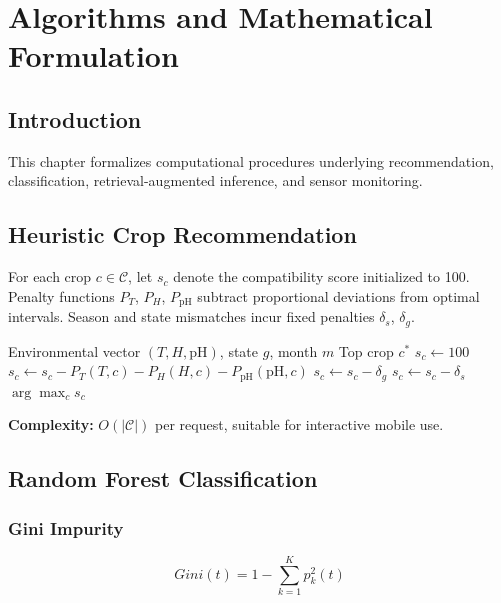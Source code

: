 \chapter{Algorithms and Mathematical Formulation}
\label{ch:algorithms}

\section{Introduction}
This chapter formalizes computational procedures underlying recommendation, classification, retrieval-augmented inference, and sensor monitoring.

\section{Heuristic Crop Recommendation}
\label{sec:algo_heuristic}

For each crop $c \in \mathcal{C}$, let $s_c$ denote the compatibility score initialized to 100. Penalty functions $P_T$, $P_H$, $P_{\mathrm{pH}}$ subtract proportional deviations from optimal intervals. Season and state mismatches incur fixed penalties $\delta_s$, $\delta_g$.

\begin{algorithm}[htbp]
\caption{Heuristic Crop Scoring}
\label{alg:heuristic}
\begin{algorithmic}[1]
\Require Environmental vector $(T, H, \mathrm{pH})$, state $g$, month $m$
\Ensure Top crop $c^\ast$
  \State $s_c \gets 100$
  \State $s_c \gets s_c - P_T(T, c) - P_H(H, c) - P_{\mathrm{pH}}(\mathrm{pH}, c)$
   \State $s_c \gets s_c - \delta_g$ \EndIf
   \State $s_c \gets s_c - \delta_s$ \EndIf
\EndFor
\State \Return $\arg\max_c s_c$
\end{algorithmic}
\end{algorithm}

\textbf{Complexity:} $O(|\mathcal{C}|)$ per request, suitable for interactive mobile use.

\section{Random Forest Classification}
\label{sec:algo_rf}

\subsection{Gini Impurity}
\begin{equation}
Gini(t) = 1 - \sum_{k=1}^{K} p_k^2(t)
\label{eq:gini}
\end{equation}

